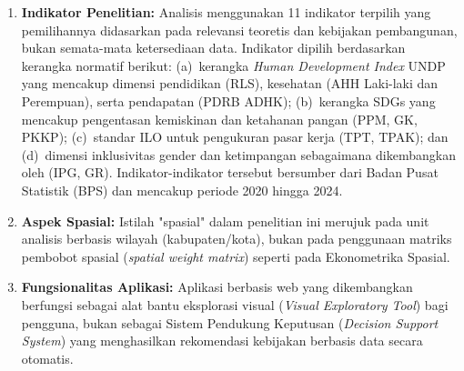 \begin{enumerate}
    \item \textbf{Indikator Penelitian:} Analisis menggunakan 11 indikator terpilih yang pemilihannya didasarkan pada relevansi teoretis dan kebijakan pembangunan, bukan semata-mata ketersediaan data. Indikator dipilih berdasarkan kerangka normatif berikut: (a)~kerangka \textit{Human Development Index} UNDP yang mencakup dimensi pendidikan (RLS), kesehatan (AHH Laki-laki dan Perempuan), serta pendapatan (PDRB ADHK); (b)~kerangka SDGs yang mencakup pengentasan kemiskinan dan ketahanan pangan (PPM, GK, PKKP); (c)~standar ILO untuk pengukuran pasar kerja (TPT, TPAK); dan (d)~dimensi inklusivitas gender dan ketimpangan sebagaimana dikembangkan oleh \citet{alfia2024} (IPG, GR). Indikator-indikator tersebut bersumber dari Badan Pusat Statistik (BPS) dan mencakup periode 2020 hingga 2024.
    \item \textbf{Aspek Spasial:} Istilah "spasial" dalam penelitian ini merujuk pada unit analisis berbasis wilayah (kabupaten/kota), bukan pada penggunaan matriks pembobot spasial (\textit{spatial weight matrix}) seperti pada Ekonometrika Spasial.
    \item \textbf{Fungsionalitas Aplikasi:} Aplikasi berbasis web yang dikembangkan berfungsi sebagai alat bantu eksplorasi visual (\textit{Visual Exploratory Tool}) bagi pengguna, bukan sebagai Sistem Pendukung Keputusan (\textit{Decision Support System}) yang menghasilkan rekomendasi kebijakan berbasis data secara otomatis.
\end{enumerate}